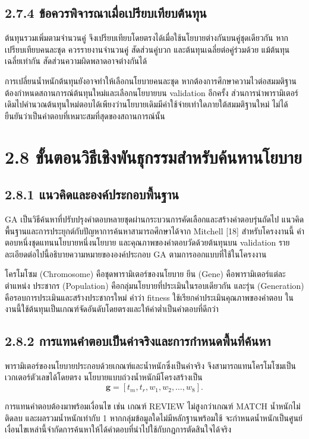 \subsection*{2.7.4 ข้อควรพิจารณาเมื่อเปรียบเทียบต้นทุน}
ต้นทุนรวมเพิ่มตามจำนวนคู่ จึงเปรียบเทียบโดยตรงได้เมื่อใช้นโยบายต่างกันบนคู่ชุดเดียวกัน หากเปรียบเทียบคนละชุด ควรรายงานจำนวนคู่ สัดส่วนคู่บวก และต้นทุนเฉลี่ยต่อคู่ร่วมด้วย แม้ต้นทุนเฉลี่ยเท่ากัน สัดส่วนความผิดพลาดอาจต่างกันได้

การเปลี่ยนน้ำหนักต้นทุนยังอาจทำให้เลือกนโยบายคนละชุด หากต้องการศึกษาความไวต่อสมมติฐาน ต้องกำหนดสถานการณ์ต้นทุนใหม่และเลือกนโยบายบน validation อีกครั้ง ส่วนการนำพารามิเตอร์เดิมไปคำนวณต้นทุนใหม่ตอบได้เพียงว่านโยบายเดิมมีค่าใช้จ่ายเท่าใดภายใต้สมมติฐานใหม่ ไม่ได้ยืนยันว่าเป็นคำตอบที่เหมาะสมที่สุดของสถานการณ์นั้น

\section*{2.8 ขั้นตอนวิธีเชิงพันธุกรรมสำหรับค้นหานโยบาย}
\subsection*{2.8.1 แนวคิดและองค์ประกอบพื้นฐาน}
GA เป็นวิธีค้นหาที่ปรับปรุงคำตอบหลายชุดผ่านกระบวนการคัดเลือกและสร้างคำตอบรุ่นถัดไป แนวคิดพื้นฐานและการประยุกต์กับปัญหาการค้นหาสามารถศึกษาได้จาก Mitchell [18] สำหรับโครงงานนี้ คำตอบหนึ่งชุดแทนนโยบายหนึ่งนโยบาย และคุณภาพของคำตอบวัดด้วยต้นทุนบน validation รายละเอียดต่อไปนี้อธิบายความหมายขององค์ประกอบ GA ตามการออกแบบที่ใช้ในโครงงาน

โครโมโซม (Chromosome) คือชุดพารามิเตอร์ของนโยบาย ยีน (Gene) คือพารามิเตอร์แต่ละตำแหน่ง ประชากร (Population) คือกลุ่มนโยบายที่ประเมินในรอบเดียวกัน และรุ่น (Generation) คือรอบการประเมินและสร้างประชากรใหม่ คำว่า fitness ใช้เรียกค่าประเมินคุณภาพของคำตอบ ในงานนี้ใช้ต้นทุนเป็นเกณฑ์จัดอันดับโดยตรงและให้ค่าต่ำเป็นคำตอบที่ดีกว่า

\subsection*{2.8.2 การแทนคำตอบเป็นค่าจริงและการกำหนดพื้นที่ค้นหา}
พารามิเตอร์ของนโยบายประกอบด้วยเกณฑ์และน้ำหนักซึ่งเป็นค่าจริง จึงสามารถแทนโครโมโซมเป็นเวกเตอร์ตัวเลขได้โดยตรง นโยบายแบบถ่วงน้ำหนักมีโครงสร้างเป็น
\begin{equation*}
\boldsymbol{g}=[t_m,t_r,w_1,w_2,\ldots,w_8].
\end{equation*}

การแทนคำตอบต้องมาพร้อมเงื่อนไข เช่น เกณฑ์ REVIEW ไม่สูงกว่าเกณฑ์ MATCH น้ำหนักไม่ติดลบ และผลรวมน้ำหนักเท่ากับ 1 หากกลุ่มข้อมูลใดไม่มีหลักฐานพร้อมใช้ จะกำหนดน้ำหนักเป็นศูนย์ เงื่อนไขเหล่านี้จำกัดการค้นหาให้ได้คำตอบที่นำไปใช้กับกฎการตัดสินใจได้จริง

